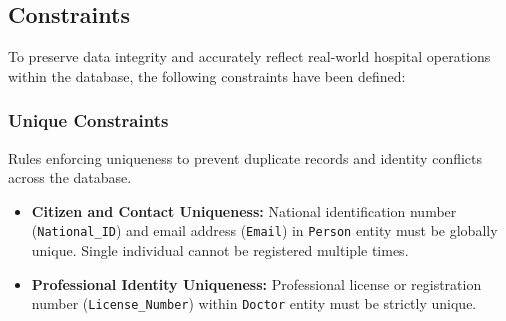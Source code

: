 \documentclass[12pt,a4paper]{article}
\begin{document}
\subsection{Constraints}
To preserve data integrity and accurately reflect real-world hospital operations within the database, the following constraints have been defined:

\subsubsection*{Unique Constraints}
Rules enforcing uniqueness to prevent duplicate records and identity conflicts across the database.
\begin{itemize}[label=\textbf{--}]
	\item \textbf{Citizen and Contact Uniqueness:} National identification number (\texttt{National\_ID}) and email address (\texttt{Email}) in \texttt{Person} entity must be globally unique. Single individual cannot be registered multiple times.
	\item \textbf{Professional Identity Uniqueness:} Professional license or registration number (\texttt{License\_Number}) within  \texttt{Doctor} entity must be strictly unique.
\end{itemize}

\vspace{0.5cm}
\end{document}
